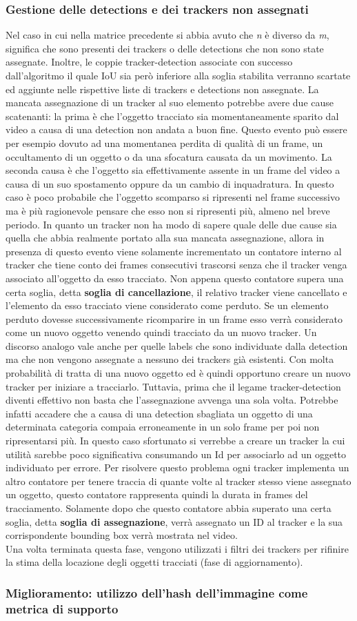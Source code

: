\subsubsection{Gestione delle detections e dei trackers non assegnati}
Nel caso in cui nella matrice precedente si abbia avuto che \textit{n} è diverso da \textit{m}, significa che sono presenti dei trackers o delle detections che non sono state assegnate. Inoltre, le coppie tracker-detection associate con successo dall'algoritmo il quale IoU sia però inferiore alla soglia stabilita verranno scartate ed aggiunte nelle rispettive liste di trackers e detections non assegnate. 
La mancata assegnazione di un tracker al suo elemento potrebbe avere due cause scatenanti: la prima è che l'oggetto tracciato sia momentaneamente sparito dal video a causa di una detection non andata a buon fine. Questo evento può essere per esempio dovuto ad una momentanea perdita di qualità di un frame, un occultamento di un oggetto o da una sfocatura causata da un movimento. La seconda causa è che l'oggetto sia effettivamente assente in un frame del video a causa di un suo spostamento oppure da un cambio di inquadratura. In questo caso è poco probabile che l'oggetto scomparso si ripresenti nel frame successivo ma è più ragionevole pensare che esso non si ripresenti più, almeno nel breve periodo. In quanto un tracker non ha modo di sapere quale delle due cause sia quella che abbia realmente portato alla sua mancata assegnazione, allora in presenza di questo evento viene solamente incrementato un contatore interno al tracker che tiene conto dei frames consecutivi trascorsi senza che il tracker venga associato all'oggetto da esso tracciato. Non appena questo contatore supera una certa soglia, detta \textbf{soglia di cancellazione}, il relativo tracker viene cancellato e l'elemento da esso tracciato viene considerato come perduto. Se un elemento perduto dovesse successivamente ricomparire in un frame esso verrà considerato come un nuovo oggetto venendo quindi tracciato da un nuovo tracker. Un discorso analogo vale anche per quelle labels che sono individuate dalla detection ma che non vengono assegnate a nessuno dei trackers già esistenti. Con molta probabilità di tratta di una nuovo oggetto ed è quindi opportuno creare un nuovo tracker per iniziare a tracciarlo. Tuttavia, prima che il legame tracker-detection diventi effettivo non basta che l'assegnazione avvenga una sola volta. Potrebbe infatti accadere che a causa di una detection sbagliata un oggetto di una determinata categoria compaia erroneamente in un solo frame per poi non ripresentarsi più. In questo caso sfortunato si verrebbe a creare un tracker la cui utilità sarebbe poco significativa consumando un Id per associarlo ad un oggetto individuato per errore. Per risolvere questo problema ogni tracker implementa un altro contatore per tenere traccia di quante volte al tracker stesso viene assegnato un oggetto, questo contatore rappresenta quindi la durata in frames del tracciamento. Solamente dopo che questo contatore abbia superato una certa soglia, detta \textbf{soglia di assegnazione}, verrà assegnato un ID al tracker e la sua corrispondente bounding box verrà mostrata nel video.\\
Una volta terminata questa fase, vengono utilizzati i filtri dei trackers per rifinire la stima della locazione degli oggetti tracciati (fase di aggiornamento).
\subsubsection{Miglioramento: utilizzo dell'hash dell'immagine come metrica di supporto}